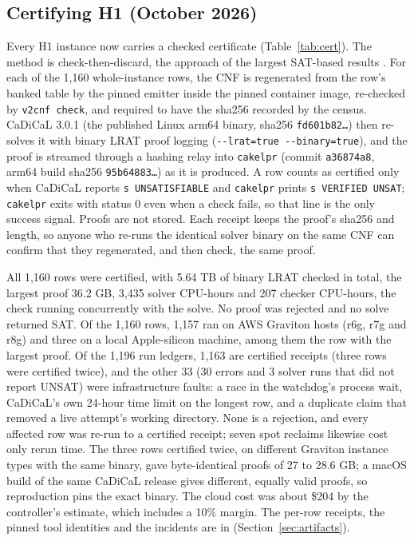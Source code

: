 \documentclass{anvil-paper}
\newcommand{\repobase}{https://github.com/rjwalters/lean-genius/blob/erdos85/integration}
\newcommand{\repofile}[2]{\href{\repobase/#1}{\lean{#2}}}
\newcommand{\cakelpr}{\texttt{cake\textunderscore lpr}}
\theoremstyle{definition}
\begin{document}
\subsection{Certifying H1 (October 2026)}\label{sec:cost}

Every H1 instance now carries a checked certificate (Table~\ref{tab:cert}). The method is check-then-discard, the approach of the largest SAT-based results \citep{heule2016pythagorean,heule2018schur}. For each of the 1,160 whole-instance rows, the CNF is regenerated from the row's banked table by the pinned  emitter inside the pinned container image, re-checked by \texttt{v2cnf check}, and required to have the sha256 recorded by the census. CaDiCaL 3.0.1 (the published Linux arm64 binary, sha256 \texttt{fd601b82\ldots}) then re-solves it with binary LRAT proof logging (\texttt{-{}-lrat=true -{}-binary=true}), and the proof is streamed through a hashing relay into \cakelpr{} \citep{tan2021cakelpr} (commit \texttt{a36874a8}, arm64 build sha256 \texttt{95b64883\ldots}) as it is produced. A row counts as certified only when CaDiCaL reports \texttt{s UNSATISFIABLE} and \cakelpr{} prints \texttt{s VERIFIED UNSAT}; \cakelpr{} exits with status 0 even when a check fails, so that line is the only success signal. Proofs are not stored. Each receipt keeps the proof's sha256 and length, so anyone who re-runs the identical solver binary on the same CNF can confirm that they regenerated, and then check, the same proof.

All 1,160 rows were certified, with 5.64 TB of binary LRAT checked in total, the largest proof 36.2 GB, 3,435 solver CPU-hours and 207 checker CPU-hours, the check running concurrently with the solve. No proof was rejected and no solve returned SAT. Of the 1,160 rows, 1,157 ran on AWS Graviton hosts (r6g, r7g and r8g) and three on a local Apple-silicon machine, among them the row with the largest proof. Of the 1,196 run ledgers, 1,163 are certified receipts (three rows were certified twice), and the other 33 (30 errors and 3 solver runs that did not report UNSAT) were infrastructure faults: a race in the watchdog's process wait, CaDiCaL's own 24-hour time limit on the longest row, and a duplicate claim that removed a live attempt's working directory. None is a rejection, and every affected row was re-run to a certified receipt; seven spot reclaims likewise cost only rerun time. The three rows certified twice, on different Graviton instance types with the same binary, gave byte-identical proofs of 27 to 28.6 GB; a macOS build of the same CaDiCaL release gives different, equally valid proofs, so reproduction pins the exact binary. The cloud cost was about \$204 by the controller's estimate, which includes a 10\% margin. The per-row receipts, the pinned tool identities and the incidents are in \repofile{research/problems/erdos-85-wip-01/h1_cert_full_20261001/receipts/}{h1_cert_full_20261001/receipts/} (Section~\ref{sec:artifacts}).
\end{document}
